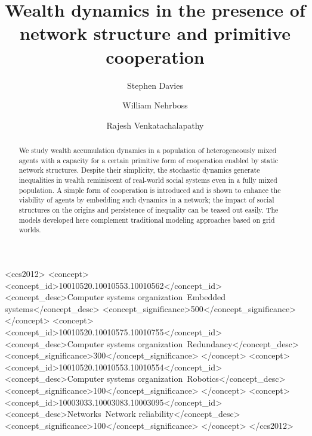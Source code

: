 \documentclass[sigconf]{acmart}
\begin{document}
\title{Wealth dynamics in the presence of network structure and primitive cooperation}

\author{Stephen Davies}



\author{William Nehrboss}


\author{Rajesh Venkatachalapathy}






\begin{abstract}
We study wealth accumulation dynamics in a population of heterogeneously mixed agents with a capacity for a certain primitive form of cooperation enabled by static network structures. Despite their simplicity, the stochastic dynamics generate inequalities in wealth reminiscent of real-world social systems even in a fully mixed population. A simple form of cooperation is introduced and is shown to enhance the viability of agents by embedding such dynamics in a network; the impact of social structures on the origins and persistence of inequality can be teased out easily. The models developed here complement traditional modeling approaches based on grid worlds.   

\end{abstract}

%
%
\begin{CCSXML}
<ccs2012>
 <concept>
  <concept_id>10010520.10010553.10010562</concept_id>
  <concept_desc>Computer systems organization~Embedded systems</concept_desc>
  <concept_significance>500</concept_significance>
 </concept>
 <concept>
  <concept_id>10010520.10010575.10010755</concept_id>
  <concept_desc>Computer systems organization~Redundancy</concept_desc>
  <concept_significance>300</concept_significance>
 </concept>
 <concept>
  <concept_id>10010520.10010553.10010554</concept_id>
  <concept_desc>Computer systems organization~Robotics</concept_desc>
  <concept_significance>100</concept_significance>
 </concept>
 <concept>
  <concept_id>10003033.10003083.10003095</concept_id>
  <concept_desc>Networks~Network reliability</concept_desc>
  <concept_significance>100</concept_significance>
 </concept>
</ccs2012>
\end{CCSXML}
\end{document}

